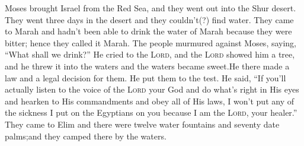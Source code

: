 \begin{inparaenum}
     Moses brought Israel from the Red Sea, and they went out into the Shur desert. They went three days in the desert and they couldn't(?) find water.%
     They came to Marah and hadn't been able to drink the water of Marah because they were bitter; hence they called it Marah.%
     The people murmured against Moses, saying, ``What shall we drink?''%
     He cried to the \textsc{Lord}, and the \textsc{Lord} showed him a tree, and he threw it into the waters and the waters became sweet.\hspace*{4em}He there made a law and a legal decision for them. He put them to the test.%
     He said, ``If you'll actually listen to the voice of the \textsc{Lord} your God and do what's right in His eyes and hearken to His commandments and obey all of His laws, I won't put any of the sickness I put on the Egyptians on you because I am the \textsc{Lord}, your healer.''%
     They came to Elim and there were twelve water fountains and seventy date palms;and they camped there by the waters.%
\end{inparaenum}
